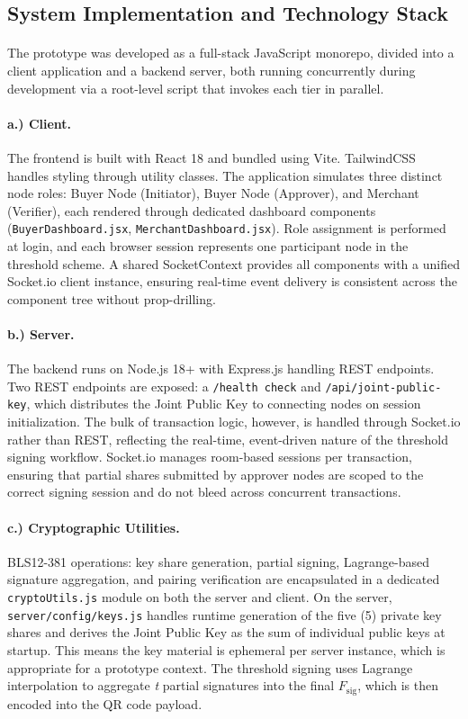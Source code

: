 \documentclass[a4paper]{scl-article}
\begin{document}
\subsection{System Implementation and Technology Stack}
\label{sect:meth4_d}
\paragraph{}The prototype was developed as a full-stack JavaScript monorepo, divided into a client application and a backend server, both running concurrently during development via a root-level script that invokes each tier in parallel.

\paragraph{a.) Client.}
The frontend is built with React 18 and bundled using Vite. TailwindCSS handles styling through utility classes. The application simulates three distinct node roles: Buyer Node (Initiator), Buyer Node (Approver), and Merchant (Verifier), each rendered through dedicated dashboard components (\texttt{BuyerDashboard.jsx}, \texttt{MerchantDashboard.jsx}). Role assignment is performed at login, and each browser session represents one participant node in the threshold scheme. A shared SocketContext provides all components with a unified Socket.io client instance, ensuring real-time event delivery is consistent across the component tree without prop-drilling.


\paragraph{b.) Server.}
The backend runs on Node.js 18+ with Express.js handling REST endpoints. Two REST endpoints are exposed: a \texttt{/health check} and \texttt{/api/joint-public-key}, which distributes the Joint Public Key to connecting nodes on session initialization. The bulk of transaction logic, however, is handled through Socket.io rather than REST, reflecting the real-time, event-driven nature of the threshold signing workflow. Socket.io manages room-based sessions per transaction, ensuring that partial shares submitted by approver nodes are scoped to the correct signing session and do not bleed across concurrent transactions.


\paragraph{c.) Cryptographic Utilities.}
BLS12-381 operations: key share generation, partial signing, Lagrange-based signature aggregation, and pairing verification are encapsulated in a dedicated \texttt{cryptoUtils.js} module on both the server and client. On the server, \texttt{server/config/keys.js} handles runtime generation of the five (5) private key shares and derives the Joint Public Key as the sum of individual public keys at startup. This means the key material is ephemeral per server instance, which is appropriate for a prototype context. The threshold signing uses Lagrange interpolation to aggregate \textit{t} partial signatures into the final  $F_{\text{sig}}$, which is then encoded into the QR code payload.
\end{document}
